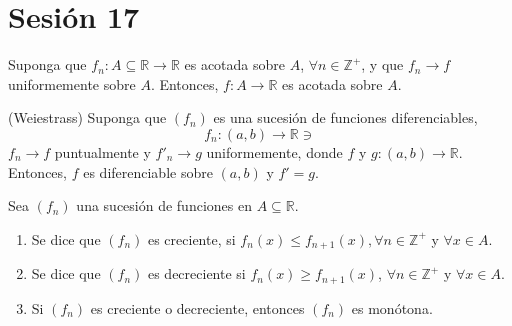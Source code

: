 \section{Sesión 17}

\begin{teorema}
	Suponga que $f_n:A\subseteq \mathbb{R}\to\mathbb{R}$ es acotada sobre $A$, $\forall n\in\mathbb{Z}^+$, y que $f_n\to f$ uniformemente sobre $A$. Entonces, $f:A\to \mathbb{R}$ es acotada sobre $A$. 
\end{teorema}

\begin{teorema}(Weiestrass)
	Suponga que $(f_n)$ es una sucesión de funciones diferenciables, 
	$$f_n:(a,b)\to\mathbb{R}\ni$$
	$f_n\to f$ puntualmente y $f'_n\to g$ uniformemente, donde $f$ y $g:(a,b)\to\mathbb{R}$. Entonces, $f$ es diferenciable sobre $(a,b)$ y $f'=g$. 
\end{teorema}

\begin{definicion}
	Sea $(f_n)$ una sucesión de funciones en $A\subseteq \mathbb{R}$. 
	\begin{enumerate}
		\item Se dice que $(f_n)$ es creciente, si $f_n(x)\leq f_{n+1}(x), \forall n\in \mathbb{Z}^+$ y $\forall x\in A$. 
		\item Se dice que $(f_n)$ es decreciente si $f_n(x)\geq f_{n+1}(x)$, $\forall n\in \mathbb{Z}^+$ y $\forall x\in A$. 
		\item Si $(f_n)$ es creciente o decreciente, entonces $(f_n)$ es monótona. 
	\end{enumerate}
\end{definicion}

